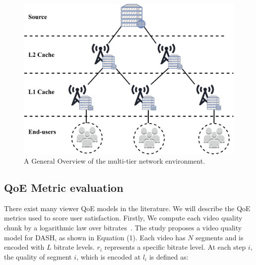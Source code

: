\begin{figure}
    \centering
    \includegraphics[width=\linewidth]{images/qoe-multi-level-2.pdf}
    \caption{A General Overview of the multi-tier network environment.}
    \label{fig:exp-setup-scenario}
\end{figure}



\subsection{QoE Metric evaluation}

There exist many viewer QoE models in the literature. We will describe the QoE metrics used to score user satisfaction. Firstly, We compute each video quality chunk by a logarithmic law over bitrates~\cite{Reichl:TSys2013}. The study proposes a video quality model for DASH, as shown in Equation (1). Each video has $N$ segments and is encoded with $L$ bitrate levels. $r_i$ represents a specific bitrate level. At each step $i$, the quality of segment $i$, which is encoded at $l_i$ is defined as:

